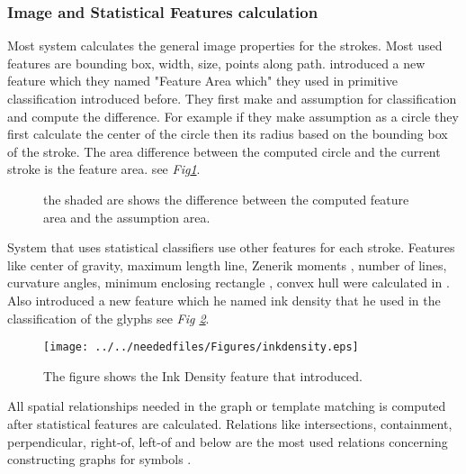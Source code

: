 
\subsubsection{Image and Statistical Features calculation}
\label{sec:ImageandStatisticalFeaturescalculation}


Most system calculates the general image properties for the strokes. Most used features are bounding box, width, size, points along path. 
\cite {meanshift10,domainindependent17}  introduced a new feature which they named "Feature Area which" they used in primitive classification introduced before. They first make and assumption for classification and compute the difference. For example if they make assumption as a circle they first calculate the center of the circle then its radius based on the bounding box of the stroke. The area difference between the computed circle and the current stroke is the feature area. see \textit{Fig\ref{fig:featurearearc}}. 

\begin{figure}


		
			\caption[Feature area]{the shaded are shows the difference between the computed feature area and the assumption area. }
	\label{fig:featurearearc}
\end{figure}

 System that uses statistical classifiers use other features for each stroke. Features like center of gravity\cite{gestureexample12,sketchunderstanding1}, maximum length line, Zenerik moments \cite{zernike61}, number of lines, curvature angles, minimum enclosing rectangle\cite {incrmentintention41} , convex hull were calculated in \cite {Cali63}.  Also \cite {geometrydomain49} introduced a new feature which he named ink density that he used in the classification of the glyphs see \textit{Fig \ref{fig:inkdensity}}. 
\begin{figure}
	\centering
		\texttt{[image: ../../neededfiles/Figures/inkdensity.eps]}
	\caption[Statistical Feature Example]{The figure shows the Ink Density feature that \cite{geometrydomain49} introduced. }
	\label{fig:inkdensity}
\end{figure}
All spatial relationships needed in the graph or template matching is computed after statistical features are calculated. Relations like intersections, containment, perpendicular, right-of, left-of and below are the most used relations concerning constructing graphs for symbols\cite {geometrydomain49,sketchinginterfaces2} .%

